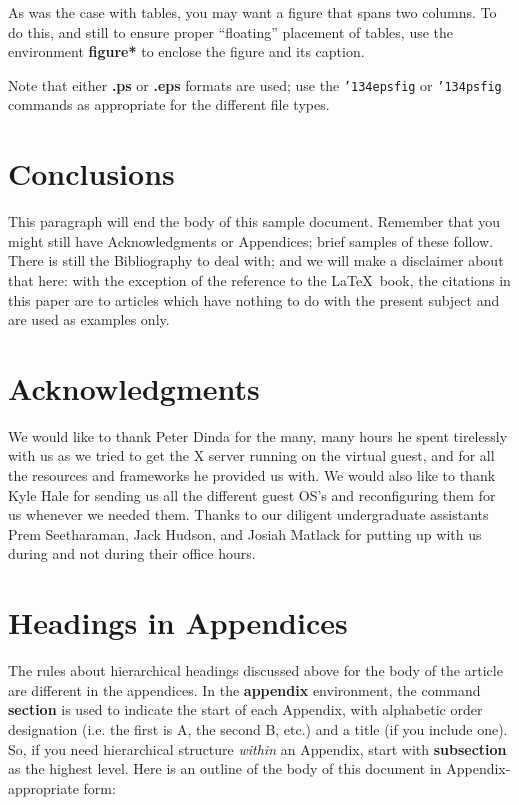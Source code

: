 \documentclass{acm_proc_article-sp}
\begin{document}
As was the case with tables, you may want a figure
that spans two columns.  To do this, and still to
ensure proper ``floating'' placement of tables, use the environment
\textbf{figure*} to enclose the figure and its caption.

Note that either {\textbf{.ps}} or {\textbf{.eps}} formats are
used; use
the \texttt{{\char'134}epsfig} or \texttt{{\char'134}psfig}
commands as appropriate for the different file types.

\section{Conclusions}
This paragraph will end the body of this sample document.
Remember that you might still have Acknowledgments or
Appendices; brief samples of these
follow.  There is still the Bibliography to deal with; and
we will make a disclaimer about that here: with the exception
of the reference to the \LaTeX\ book, the citations in
this paper are to articles which have nothing to
do with the present subject and are used as
examples only.

\section{Acknowledgments}
We would like to thank Peter Dinda for the many, many hours he spent tirelessly with us as we
tried to get the X server running on the virtual guest, and for all the
resources and frameworks he provided us with. We would also like to thank Kyle
Hale for sending us all the different guest OS's and reconfiguring them for us
whenever we needed them. Thanks to our diligent undergraduate assistants Prem
Seetharaman, Jack Hudson, and Josiah Matlack for putting up with us during and
not during their office hours.
%

%
%
\appendix
\section{Headings in Appendices}
The rules about hierarchical headings discussed above for
the body of the article are different in the appendices.
In the \textbf{appendix} environment, the command
\textbf{section} is used to
indicate the start of each Appendix, with alphabetic order
designation (i.e. the first is A, the second B, etc.) and
a title (if you include one).  So, if you need
hierarchical structure
\textit{within} an Appendix, start with \textbf{subsection} as the
highest level. Here is an outline of the body of this
document in Appendix-appropriate form:
\end{document}
